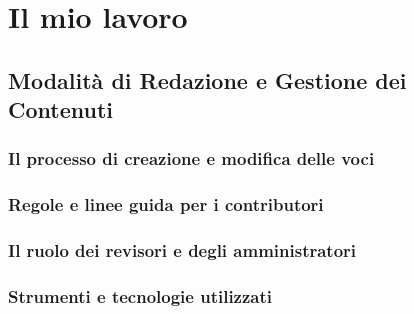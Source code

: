 \documentclass[12pt,a4paper]{report}
\begin{document}
\chapter{Il mio lavoro}
\section{Modalità di Redazione e Gestione dei Contenuti}
\subsection{Il processo di creazione e modifica delle voci}
\subsection{Regole e linee guida per i contributori}
\subsection{Il ruolo dei revisori e degli amministratori}
\subsection{Strumenti e tecnologie utilizzati}

\newpage

\printbibliography
\end{document}
